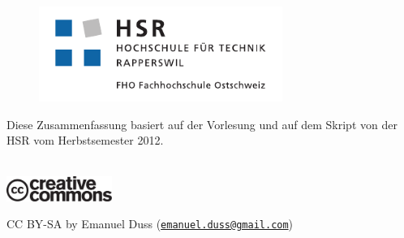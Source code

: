 \documentclass[12pt,oneside,a4paper,parskip]{scrartcl}
\title{\TITLE}
\author{\AUTHOR \\ \EMAIL}
\begin{document}
\begin{titlepage}
  \maketitle
  \thispagestyle{empty} %
  \vfill
  \begin{figure}[!htbp]
    \centering
    \includegraphics[width=300px]{hsr_logo.pdf}
  \end{figure}
\end{titlepage}

\setcounter{page}{1}
\tableofcontents

\small{
\vfill
Diese Zusammenfassung basiert auf der Vorlesung und auf dem Skript von \emph{\TITLE} der
HSR vom Herbstsemester 2012. \\ \\
\begin{center}
\includegraphics[width=130px]{cc.pdf}
\end{center}
CC BY-SA by Emanuel Duss
(\href{mailto:emanuel.duss@gmail.com}{\tt emanuel.duss@gmail.com})
% 
% 
% 
% 
}
\newpage

\end{document}
